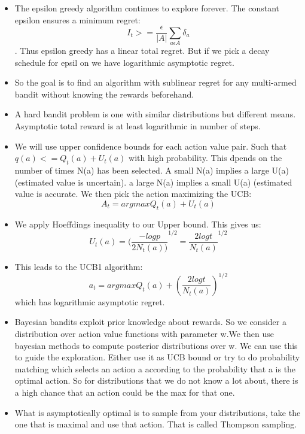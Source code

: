 \documentclass[a4paper]{article}
\begin{document}
\begin{itemize}
        \item The epsilon greedy algorithm continues to explore forever. The constant epsilon ensures a minimum regret:$$I_t >= \frac{\epsilon}{|A|}\sum_{a \epsilon A}\delta_a $$. Thus epsilon greedy has a linear total regret. But if we pick a decay schedule for epsil
        on we have logarithmic asymptotic regret. 
        \item So the goal is to find an algorithm with sublinear regret for any multi-armed bandit without knowing the rewards beforehand. 
        \item A hard bandit problem is one with similar distributions but different means. Asymptotic total reward is at least logarithmic in number of steps. 
        \item We will use upper confidence bounds for each action value pair. Such that $q(a) <= Q_t(a) + U_t(a) $ with high probability. This dpends on the number of times N(a) has been selected. A small N(a) implies a large U(a) (estimated value is uncertain). a large N(a) implies a small U(a) (estimated value is accurate.  We then pick the action maximizing the UCB:
        $$ A_t = argmax Q_t(a)  + U_t(a)$$
        \item We apply Hoeffdings inequality to our Upper bound. This gives us: $$U_t(a) = (\frac{-log p}{2N_t(a))}^{1/2} = \frac{2log t}{N_t(a)}^{1/2}$$
        \item This leads to the UCB1 algorithm: 
        $$a_t = argmax Q_t(a) + (\frac{2log t}{N_t(a)})^{1/2}$$ which has logarithmic asymptotic regret. 
        \item Bayesian bandits exploit prior knowledge about rewards. So we consider a distribution over action value functions with parameter w.We then use bayesian methods to compute posterior distributions over w. We can use this  to guide the exploration. Either use it as UCB bound or try to do probability matching which selects an action a according to the probability that a is the optimal action. So for distributions that we do not know a lot about, there is a high chance that an action could be the max for that one. 
        \item What is asymptotically optimal is to sample from your distributions, take the one that is maximal and use that action. That is called Thompson sampling. 
    \end{itemize}
\end{document}
